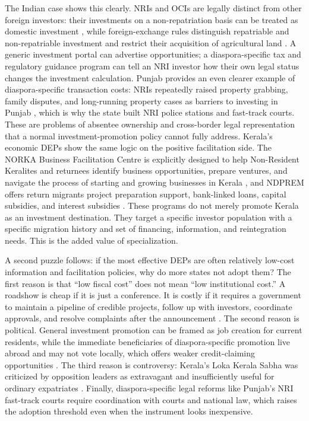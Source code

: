 \documentclass[12pt]{article}
\begin{document}
The Indian case shows this clearly. NRIs and OCIs are legally distinct from other foreign investors: their investments on a non-repatriation basis can be treated as domestic investment \citep{unctad_india_nodate}, while foreign-exchange rules distinguish repatriable and non-repatriable investment and restrict their acquisition of agricultural land \citep{reserve_bank_of_india_reserve_nodate}. A generic investment portal can advertise opportunities; a diaspora-specific tax and regulatory guidance program can tell an NRI investor how their own legal status changes the investment calculation. Punjab provides an even clearer example of diaspora-specific transaction costs: NRIs repeatedly raised property grabbing, family disputes, and long-running property cases as barriers to investing in Punjab \citep{pti_punjabi_2022}, which is why the state built NRI police stations and fast-track courts. These are problems of absentee ownership and cross-border legal representation that a normal investment-promotion policy cannot fully address. Kerala's economic DEPs show the same logic on the positive facilitation side. The NORKA Business Facilitation Centre is explicitly designed to help Non-Resident Keralites and returnees identify business opportunities, prepare ventures, and navigate the process of starting and growing businesses in Kerala \citep{norka_nbfc_nodate}, and NDPREM offers return migrants project preparation support, bank-linked loans, capital subsidies, and interest subsidies \citep{norka_ndprem_nodate}. These programs do not merely promote Kerala as an investment destination. They target a specific investor population with a specific migration history and set of financing, information, and reintegration needs. This is the added value of specialization.

A second puzzle follows: if the most effective DEPs are often relatively low-cost information and facilitation policies, why do more states not adopt them? The first reason is that ``low fiscal cost'' does not mean ``low institutional cost.'' A roadshow is cheap if it is just a conference. It is costly if it requires a government to maintain a pipeline of credible projects, follow up with investors, coordinate approvals, and resolve complaints after the announcement \citep{newland_developing_2012}. The second reason is political. General investment promotion can be framed as job creation for current residents, while the immediate beneficiaries of diaspora-specific promotion live abroad and may not vote locally, which offers weaker credit-claiming opportunities \citep{jensen_pass_2014}. The third reason is controversy: Kerala's Loka Kerala Sabha was criticized by opposition leaders as extravagant and insufficiently useful for ordinary expatriates \citep{tnn_cut_2022}. Finally, diaspora-specific legal reforms like Punjab's NRI fast-track courts require coordination with courts and national law, which raises the adoption threshold even when the instrument looks inexpensive.
\end{document}
